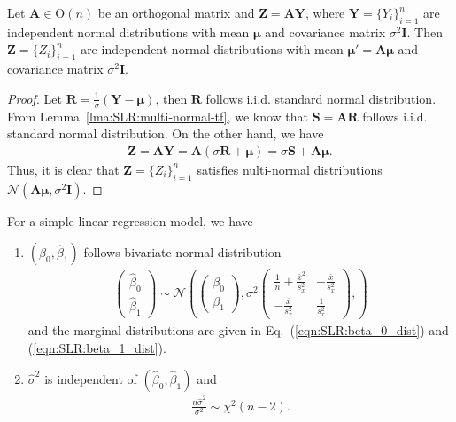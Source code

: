 \documentclass{book}
\begin{document}
\theorem 
\label{thm:SLR:multi-var-tf}
Let $\mathbf{A} \in \mathrm{O}(n)$ be an orthogonal matrix and $\mathbf{Z} = \mathbf{A} \mathbf{Y}$, where $\mathbf{Y} = \{Y_i\}_{i=1}^n$ are independent normal distributions with mean $\boldsymbol{\mu}$ and  covariance matrix $\sigma^2\mathbf{I}$. Then $\mathbf{Z} = \{Z_i\}_{i=1}^n$ are independent normal distributions with mean $\boldsymbol{\mu}' = \mathbf{A}\boldsymbol{\mu}$ and covariance matrix $\sigma^2\mathbf{I}$.
\begin{proof}
Let $\mathbf{R} = \frac{1}{\sigma}(\mathbf{Y} - \boldsymbol{\mu})$, then $\mathbf{R}$ follows i.i.d. standard normal distribution. From Lemma~\ref{lma:SLR:multi-normal-tf}, we know that $\mathbf{S} = \mathbf{A}\mathbf{R}$ follows i.i.d. standard normal distribution. On the other hand, we have 
\begin{align*}
    \mathbf{Z} = \mathbf{A} \mathbf{Y} = \mathbf{A} (\sigma\mathbf{R} + \boldsymbol{\mu}) = \sigma \mathbf{S} + \mathbf{A}\boldsymbol{\mu}.
\end{align*}
Thus, it is clear that $\mathbf{Z} = \{Z_i\}_{i=1}^n$ satisfies nulti-normal distributions $\mathcal{N}(\mathbf{A}\boldsymbol{\mu},\sigma^2\mathbf{I})$.
\end{proof}

\theorem For a simple linear regression model, we have 
\begin{enumerate}
\item $(\hat{\beta}_0, \hat{\beta}_1)$ follows bivariate normal distribution
\begin{align}
    \begin{pmatrix}
        \hat{\beta}_0\\ \hat{\beta}_1
    \end{pmatrix}
    \sim
    \mathcal{N}\left(
    \begin{pmatrix}
        \beta_0\\\beta_1
    \end{pmatrix},\sigma^2
    \begin{pmatrix}
        \frac{1}{n} + \frac{\bar{x}^2}{s_x^2} & -\frac{\bar{x}}{s_x^2}\\
        -\frac{\bar{x}}{s_x^2} & \frac{1}{s_x^2}
    \end{pmatrix},
    \right)
\end{align}
and the marginal distributions are given in Eq.~(\ref{eqn:SLR:beta_0_dist}) and (\ref{eqn:SLR:beta_1_dist}).
\item $\hat{\sigma}^2$ is independent of $(\hat{\beta}_0, \hat{\beta}_1)$ and 
\begin{align}
    \frac{n\hat{\sigma}^2}{\sigma^2} \sim \chi^2(n-2).
\end{align}
\end{enumerate}
\end{document}
